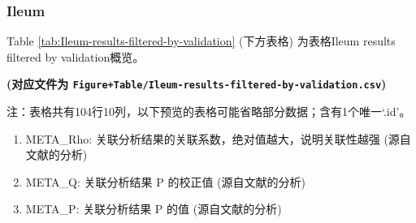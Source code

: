 \documentclass[
]{article}
\providecommand{\tightlist}{%
  \setlength{\itemsep}{0pt}\setlength{\parskip}{0pt}}
\begin{document}
\hypertarget{ileum-1}{%
\subsubsection{Ileum}\label{ileum-1}}

Table \ref{tab:Ileum-results-filtered-by-validation} (下方表格) 为表格Ileum results filtered by validation概览。

\textbf{(对应文件为 \texttt{Figure+Table/Ileum-results-filtered-by-validation.csv})}

\begin{center}\begin{tcolorbox}[colback=gray!10, colframe=gray!50, width=0.9\linewidth, arc=1mm, boxrule=0.5pt]注：表格共有104行10列，以下预览的表格可能省略部分数据；含有1个唯一`.id'。
\end{tcolorbox}
\end{center}
\begin{center}\begin{tcolorbox}[colback=gray!10, colframe=gray!50, width=0.9\linewidth, arc=1mm, boxrule=0.5pt]\begin{enumerate}\tightlist
\item META\_Rho:  关联分析结果的关联系数，绝对值越大，说明关联性越强 (源自文献的分析)
\item META\_Q:  关联分析结果 P 的校正值 (源自文献的分析)
\item META\_P:  关联分析结果 P 的值 (源自文献的分析)
\end{enumerate}\end{tcolorbox}
\end{center}
\end{document}
